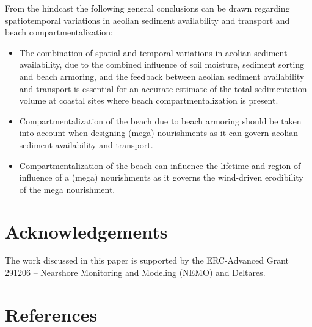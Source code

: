 \documentclass[preprint,12pt,authoryear]{elsarticle}
\begin{document}
\noindent From the hindcast the following general conclusions can be
drawn regarding spatiotemporal variations in aeolian sediment
availability and transport and beach compartmentalization:

\begin{itemize}
\item The combination of spatial and temporal variations in aeolian
  sediment availability, due to the combined influence of soil
  moisture, sediment sorting and beach armoring, and the feedback
  between aeolian sediment availability and transport is essential for
  an accurate estimate of the total sedimentation volume at coastal
  sites where beach compartmentalization is present.
\item Compartmentalization of the beach due to beach armoring should
  be taken into account when designing (mega) nourishments as it
  can govern aeolian sediment availability and transport.
\item Compartmentalization of the beach can influence the lifetime and
  region of influence of a (mega) nourishments as it governs the
  wind-driven erodibility of the mega nourishment.
\end{itemize}

\section*{Acknowledgements}
The work discussed in this paper is supported by the ERC-Advanced
Grant 291206 -- Nearshore Monitoring and Modeling (NEMO) and Deltares.

\appendix



\section*{References}
{}
\end{document}
